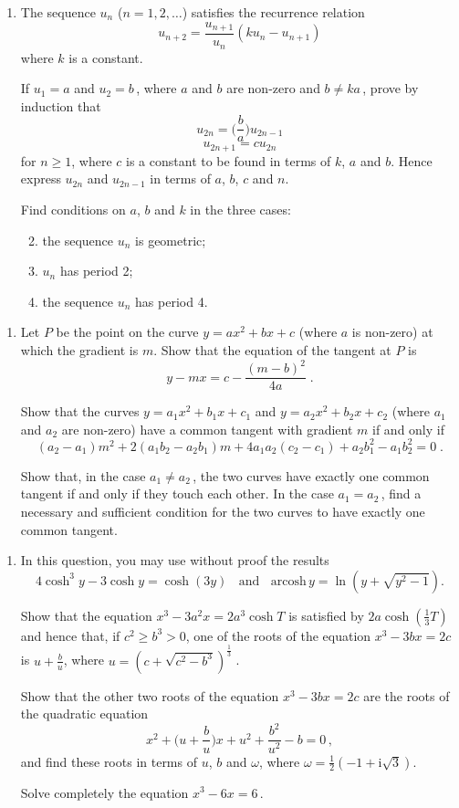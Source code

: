 \documentclass[a4, 11pt]{report}
\newlength{\qspace}
\newcounter{qnumber}
\newenvironment{question}%
 {\vspace{\qspace}
  \begin{enumerate}[\bfseries 1\quad][10]%
    \setcounter{enumi}{\value{qnumber}}%
    \item%
 }
{
  \end{enumerate}
  \filbreak
  \stepcounter{qnumber}
 }
\newenvironment{questionparts}[1][1]%
 {
  \begin{enumerate}[\bfseries (i)]%
    \setcounter{enumii}{#1}
    \addtocounter{enumii}{-1}
    \setlength{\itemsep}{5mm}
    \setlength{\parskip}{8pt}
 }
 {
  \end{enumerate}
 }
\def\ge{\geqslant}
\newcommand{\ds}{\displaystyle}
\def\l{\left(}
\def\r{\right)}
\begin{document}
\begin{question}
The sequence $u_n$ ($n= 1, 2, \ldots$) satisfies the recurrence relation 
\[ 
u_{n+2}= \frac{u_{n+1}}{u_n}(ku_n-u_{n+1})  
\] 
where  $k$ is a constant. 
 
If $u_1=a$ and $u_2=b\,$,  
where $a$ and  $b$ are non-zero and $b \ne ka\,$, prove by induction that 
\[ 
u_{2n}=\Big(\frac b a \Big) u_{2n-1} 
\] 
\[ 
u_{2n+1}= c u_{2n} 
\] 
for $n \ge 1$,  
where $c$ is a constant to be found in terms of $k$, $a$ and $b$. 
Hence express $u_{2n}$ and $u_{2n-1}$ in terms of $a$, $b$, $c$ and $n$. 
 
Find conditions on $a$, $b$ and $k$ in the three cases: 
\begin{questionparts}
\item the sequence $u_n$ is geometric;
\item $u_n$ has period 2; 
\item the sequence $u_n$  has period 4. 
\end{questionparts} 
\end{question}

\begin{question}
Let $P$ be the point on 
the curve
$y=ax^2+bx+c$ (where $a$ is non-zero) at which the gradient  
is $m$. 
Show   that the equation of the tangent at $P$ is 
\[ 
y-mx=c-\frac{(m-b)^2}{4a}\;. 
\] 
 
Show that the curves  
$y=a_1 x^2+b_1 x+c_1$ 
and $y=a_2 x^2+b_2 x+c_2$  
(where $a_1$ and $a_2$ 
are non-zero) have a common tangent  
with gradient $m$ if and only if 
\[ 
(a_2 -a_1 )m^2 +
2(a_1 b_2-a_2 b_1)m +
4a_1 a_2(c_2-c_1)+
a_2 b_1^2-a_1 b_2 ^2=0\;. 
\] 

Show that, in the case  $a_1 \ne a_2 \,$, 
the two curves have exactly one common  
tangent if and only if they touch each other.
In the case $a_1 =a_2\,$, 
find  a necessary and sufficient condition  
for the two curves to have exactly one common tangent.
	\end{question}
	
\begin{question}
In this question, you may use without proof the results
\[
4 \cosh^3 y - 3 \cosh y = \cosh (3y)
\ \ \ \ \text{and} \ \ \ \ 
\mathrm{arcosh} \, y = \ln ( y+\sqrt{y^2-1}).
\] 
 

Show that the equation $x^3 - 3a^2x = 2a^3 \cosh T$  
is satisfied by $ 2a \cosh \l \frac13 T \r$  
and hence that, if $c^2\ge b^3>0$,  
one of the roots of the equation $x^3-3bx=2c$  
is $\ds u+\frac{b}{u}$, where 
$u = (c+\sqrt{c^2-b^3})^{\frac13}\;$. 
 
Show that the other two roots of  
the equation $x^3-3bx=2c$ are the roots of the  
quadratic equation  
\[\ds x^2 + \Big( u+\frac{b}{u}\Big) x + u^2+\frac{b^2}{u^2}-b=0\, ,\]  
and find these roots in terms of $u$, $b$  and $\omega$,  
where $\omega = \frac{1}{2}(-1 + \mathrm{i}\sqrt{3})$. 
 
Solve completely the equation $x^3-6x=6\,$. 
\end{question}
	
\end{document}
